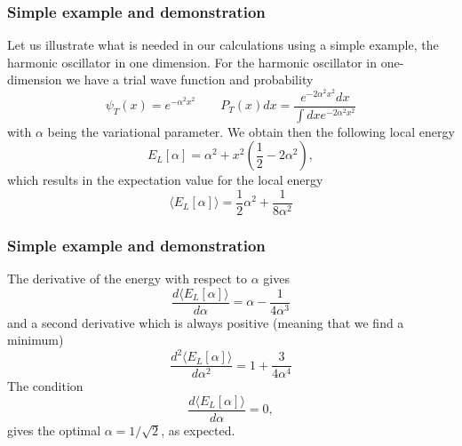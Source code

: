 \documentclass{beamer}
\begin{document}
\begin{frame}
\frametitle{Simple example and demonstration}

\begin{block}{}
Let us illustrate what is needed in our calculations using a simple example, the harmonic oscillator in one dimension.
For the harmonic oscillator in one-dimension we have a  trial wave function and probability
\begin{equation*}
\psi_T(x) = e^{-\alpha^2 x^2} \qquad P_T(x)dx = \frac{e^{-2\alpha^2 x^2}dx}{\int dx e^{-2\alpha^2 x^2}}
\end{equation*}
with $\alpha$ being the variational parameter. 
We obtain then the following local energy
\begin{equation*}
E_L[\alpha] = \alpha^2+x^2\left(\frac{1}{2}-2\alpha^2\right),
\end{equation*}
which results in the expectation value for the local energy
\begin{equation*}
\langle  E_L[\alpha]\rangle = \frac{1}{2}\alpha^2+\frac{1}{8\alpha^2}
\end{equation*}
\end{block}
\end{frame}

\begin{frame}
\frametitle{Simple example and demonstration}

\begin{block}{}
The derivative of the energy with respect to $\alpha$ gives
\begin{equation*}
\frac{d\langle  E_L[\alpha]\rangle}{d\alpha} = \alpha-\frac{1}{4\alpha^3}
\end{equation*}
and a second derivative which is always positive (meaning that we find a minimum)
\begin{equation*}
\frac{d^2\langle  E_L[\alpha]\rangle}{d\alpha^2} = 1+\frac{3}{4\alpha^4}
\end{equation*}
The condition
\begin{equation*}
\frac{d\langle  E_L[\alpha]\rangle}{d\alpha} = 0,
\end{equation*}
gives the optimal $\alpha=1/\sqrt{2}$, as expected.
\end{block}
\end{frame}
\end{document}
